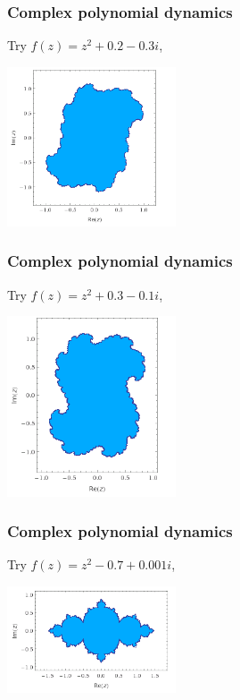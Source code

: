 \documentclass{beamer} %
\theoremstyle{definition} %
\begin{document}
\begin{frame}\frametitle{Complex polynomial dynamics}
    Try $f(z) = z^2+0.2-0.3i$,\\
    \begin{center}
        \includegraphics[width=50mm]{img/julia02-03-filled.png}
    \end{center}
\end{frame}

\begin{frame}\frametitle{Complex polynomial dynamics}
    Try $f(z) = z^2+0.3-0.1i$,\\
    \begin{center}
        \includegraphics[width=50mm]{img/julia03-01-filled.png}
    \end{center}
\end{frame}

\begin{frame}\frametitle{Complex polynomial dynamics}
    Try $f(z) = z^2-0.7+0.001i$,\\
    \begin{center}
        \includegraphics[width=50mm]{img/julia-07001-filled.png}
    \end{center}
\end{frame}
\end{document}
